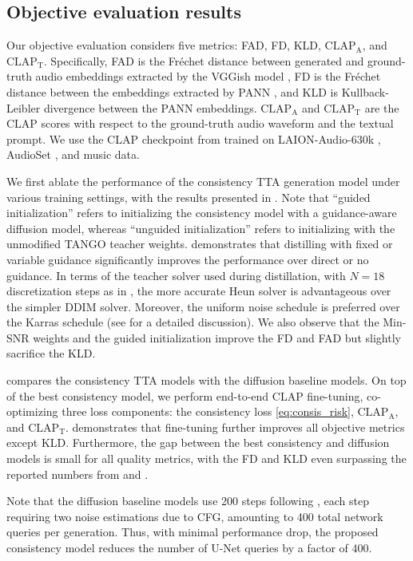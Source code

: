 \documentclass{article}
\newcommand{\CLAPA}{\text{CLAP}_\text{A}}
\newcommand{\CLAPT}{\text{CLAP}_\text{T}}
\begin{document}
\subsection{Objective evaluation results}

Our objective evaluation considers five metrics: FAD, FD, KLD, $\CLAPA$, and $\CLAPT$. Specifically, FAD is the Fr\'echet distance between generated and ground-truth audio embeddings extracted by the VGGish model \cite{vggish}, FD is the Fr\'echet distance between the embeddings extracted by PANN \cite{pann}, and KLD is Kullback-Leibler divergence between the PANN embeddings. $\CLAPA$ and $\CLAPT$ are the CLAP scores with respect to the ground-truth audio waveform and the textual prompt. We use the CLAP checkpoint from \cite{laionclap} trained on LAION-Audio-630k \cite{laionclap}, AudioSet \cite{audioset}, and music data.

We first ablate the performance of the consistency TTA generation model under various training settings, with the results presented in . Note that ``guided initialization'' refers to initializing the consistency model with a guidance-aware diffusion model, whereas ``unguided initialization'' refers to initializing with the unmodified TANGO teacher weights.  demonstrates that distilling with fixed or variable guidance significantly improves the performance over direct or no guidance. In terms of the teacher solver used during distillation, with $N = 18$ discretization steps as in \cite{cm}, the more accurate Heun solver is advantageous over the simpler DDIM solver. Moreover, the uniform noise schedule is preferred over the Karras schedule (see  for a detailed discussion). We also observe that the Min-SNR weights and the guided initialization improve the FD and FAD but slightly sacrifice the KLD.

 compares the consistency TTA models with the diffusion baseline models. On top of the best consistency model, we perform end-to-end CLAP fine-tuning, co-optimizing three loss components: the consistency loss \cref{eq:consis_risk}, $\CLAPA$, and $\CLAPT$.  demonstrates that fine-tuning further improves all objective metrics except KLD. Furthermore, the gap between the best consistency and diffusion models is small for all quality metrics, with the FD and KLD even surpassing the reported numbers from \cite{tango} and \cite{audioldm}.

Note that the diffusion baseline models use 200 steps following \cite{audioldm, tango}, each step requiring two noise estimations due to CFG, amounting to 400 total network queries per generation. Thus, with minimal performance drop, the proposed consistency model reduces the number of U-Net queries by a factor of 400.
\end{document}
